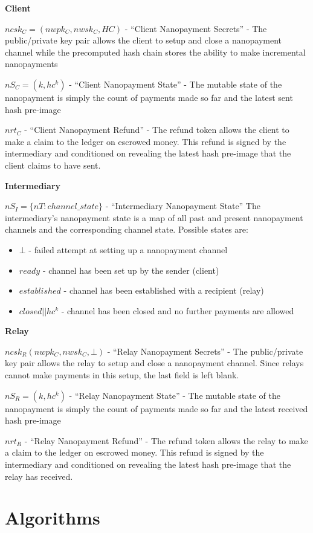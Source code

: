 \documentclass{article}
\begin{document}
\textbf{Client}

$ncsk_C = (nwpk_C, nwsk_C, HC)$ - ``Client Nanopayment Secrets'' - The public/private key pair allows the client to setup and close a nanopayment channel while the precomputed hash chain stores the ability to make incremental nanopayments

$nS_C = (k, hc^k)$ - ``Client Nanopayment State'' - The mutable state of the nanopayment is simply the count of payments made so far and the latest sent hash pre-image

$nrt_C$ - ``Client Nanopayment Refund'' - The refund token allows the client to make a claim to the ledger on escrowed money. This refund is signed by the intermediary and conditioned on revealing the latest hash pre-image that the client claims to have sent.

\textbf{Intermediary}

$nS_I = \{nT: channel\_state\}$ - ``Intermediary Nanopayment State'' The intermediary's nanopayment state is a map of all past and present nanopayment channels and the corresponding channel state. Possible states are:
\begin{itemize}
\item $\bot$ - failed attempt at setting up a nanopayment channel
\item $ready$ - channel has been set up by the sender (client)
\item $established$ - channel has been established with a recipient (relay)
\item $closed||hc^k$ - channel has been closed and no further payments are allowed
\end{itemize}

\textbf{Relay}

$ncsk_R (nwpk_C, nwsk_C, \bot)$ - ``Relay Nanopayment Secrets'' - The public/private key pair allows the relay to setup and close a nanopayment channel. Since relays cannot make payments in this setup, the last field is left blank.

$nS_R = (k, hc^k)$ - ``Relay Nanopayment State'' - The mutable state of the nanopayment is simply the count of payments made so far and the latest received hash pre-image

$nrt_R$ - ``Relay Nanopayment Refund'' - The refund token allows the relay to make a claim to the ledger on escrowed money. This refund is signed by the intermediary and conditioned on revealing the latest hash pre-image that the relay has received.

\section{Algorithms} \label{algorithms}
\end{document}
